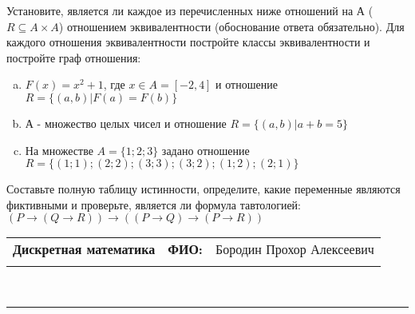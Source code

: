 \documentclass[10pt]{exam}
\newcommand{\class}{Дискретная математика}
\newcommand{\examdate}{}
\begin{document}
\begin{questions}
\question
Установите, является ли каждое из перечисленных ниже отношений на А ($R \subseteq A \times A$) отношением эквивалентности (обоснование ответа обязательно). Для каждого отношения эквивалентности постройте классы эквивалентности и постройте граф отношения:
\begin{enumerate} [a)]\setcounter{enumi}{0}
\item $F(x)=x^{2}+1$, где $x \in A = [-2, 4]$ и отношение $R = \{(a,b)|F(a) = F(b)\}$
\item А - множество целых чисел и отношение $R = \{(a,b)|a + b = 5\}$
\item На множестве $A = \{1; 2; 3\}$ задано отношение $R = \{(1; 1); (2; 2); (3; 3); (3; 2); (1; 2); (2; 1)\}$

\end{enumerate}\question Составьте полную таблицу истинности, определите, какие переменные являются фиктивными и проверьте, является ли формула тавтологией:
$(P \rightarrow (Q \rightarrow R)) \rightarrow ((P \rightarrow Q) \rightarrow (P \rightarrow R))$

\end{questions}
\newpage
\begin{flushright}
\begin{tabular}{p{2.8in} r l}
\textbf{\class} & \textbf{ФИО:} &Бородин Прохор Алексеевич
\\

\textbf{\examdate} &&\\
\end{tabular}\\
\end{flushright}
\rule[1ex]{\textwidth}{.1pt}
\end{document}
